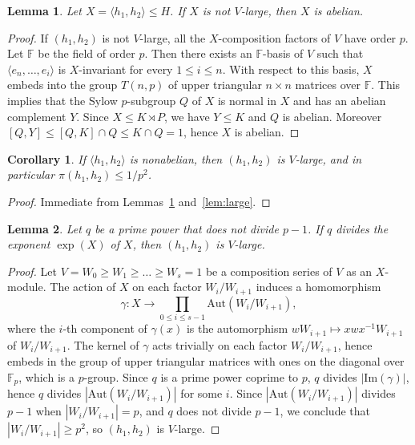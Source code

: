\documentclass[10pt,a4paper]{amsart}
\newtheorem{lemma}{Lemma}
\newtheorem{corollary}{Corollary}
\begin{document}
	\begin{lemma}\label{lem:abelian}
		Let $X=\langle h_1,h_2\rangle \leq H$. If $X$ is not $V$-large, then 
		$X$ is abelian.
	\end{lemma}
	\begin{proof}
		If $(h_1,h_2)$ is not $V$-large, all the $X$-composition 
		factors of $V$ have order $p$. Let $\mathbb{F}$ be the field 
		of order $p$. Then there exists an $\mathbb{F}$-basis of $V$ 
		such that $\langle e_n,\dots,e_i\rangle$ is $X$-invariant for 
		every $1 \leq i \leq n$. With respect to this basis, $X$ 
		embeds into the group $T(n,p)$ of upper triangular $n\times n$ 
		matrices over $\mathbb{F}$. This implies that the Sylow 
		$p$-subgroup $Q$ of $X$ is normal in $X$ and has an abelian 
		complement $Y$. Since $X \leq K \rtimes P$, we have $Y \leq K$ 
		and $Q$ is abelian. Moreover 
		$[Q,Y] \leq [Q,K] \cap Q \leq K \cap Q = 1$, hence $X$ 
		is abelian.
	\end{proof}
	
	\begin{corollary}\label{cor:nonabelian}
		If $\langle h_1,h_2\rangle$ is nonabelian, then 
		$(h_1,h_2)$ is $V$-large, and in particular 
		$\pi(h_1,h_2) \leq 1/p^2$.
	\end{corollary}
	\begin{proof}
		Immediate from Lemmas~\ref{lem:abelian} and~\ref{lem:large}.
	\end{proof}
	
	
	\begin{lemma}\label{lem:q-large}
		Let $q$ be a prime power that does not divide $p-1$. If $q$ 
		divides the exponent $\exp(X)$ of $X$, then $(h_1, h_2)$ is $V$-large.
	\end{lemma}
	\begin{proof}
		Let $V = W_0 \geq W_1 \geq \dots \geq W_s = 1$ be a composition 
		series of $V$ as an $X$-module. The action of $X$ on each factor 
		$W_i/W_{i+1}$ induces a homomorphism
		$$\gamma \colon X \to \prod_{0 \leq i \leq s-1} \mathrm{Aut}(W_i/W_{i+1}),$$
		where the $i$-th component of $\gamma(x)$ is the automorphism 
		$wW_{i+1} \mapsto xwx^{-1}W_{i+1}$ of $W_i/W_{i+1}$.
		The kernel of $\gamma$ acts trivially on each factor 
		$W_i/W_{i+1}$, hence embeds in the group of upper triangular 
		matrices with ones on the diagonal over $\mathbb{F}_p$, which 
		is a $p$-group. Since $q$ is a prime power coprime to $p$, 
		$q$ divides $|\mathrm{Im}(\gamma)|$, hence $q$ divides 
		$|\mathrm{Aut}(W_i/W_{i+1})|$ for some $i$. Since 
		$|\mathrm{Aut}(W_i/W_{i+1})|$ divides $p-1$ when 
		$|W_i/W_{i+1}| = p$, and $q$ does not divide $p-1$, we 
		conclude that $|W_i/W_{i+1}| \geq p^2$, so $(h_1,h_2)$ 
		is $V$-large.
	\end{proof}
	
\end{document}
